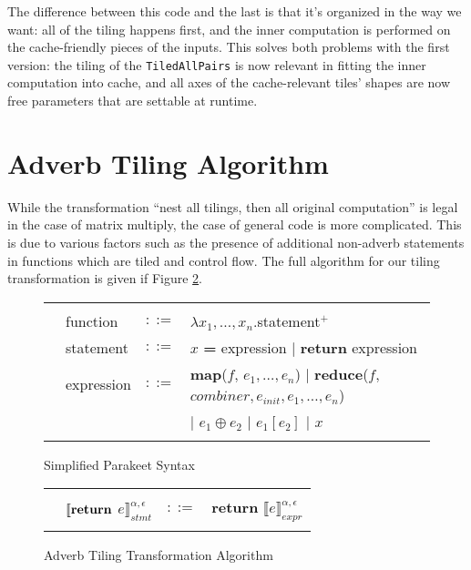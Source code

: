 The difference between this code and the last is that it's organized in the way we want: all of the tiling happens first, and the inner computation is performed on the cache-friendly pieces of the inputs. This solves both problems with the first version: the tiling of the \lstinline{TiledAllPairs} is now relevant in fitting the inner computation into cache, and all axes of the cache-relevant tiles' shapes are now free parameters that are settable at runtime.

\section{Adverb Tiling Algorithm\label{sec:adverb_tiling_algorithm}}

While the transformation ``nest all tilings, then all original computation'' is legal in the case of matrix multiply, the case of general code is more complicated.  This is due to various factors such as the presence of additional non-adverb statements in functions which are tiled and control flow.  The full algorithm for our tiling transformation is given if Figure \ref{tiling_algorithm}.

\begin{figure*}
\centering
\begin{tabular}{| m{0.01cm}llm{10.8cm} |}
\hline
& & &\\
& function   & $::=$ & $\lambda x_1,\ldots,x_n.$statement$^+$\\
& statement  & $::=$ & $x$ \textbf{= } expression $|$ \textbf{return} expression\\
& expression & $::=$ & \textbf{map}($f$, $e_1,\ldots,e_n$) $|$ \textbf{reduce}($f$, $combiner, e_{init}, e_1,\ldots,e_n$)\\
&            &       & $|$ $e_1 \oplus e_2 $ $|$ $e_1[e_2]$ $|$ $x$\\
& & &\\
\hline
\end{tabular}
\caption{Simplified Parakeet Syntax}
\label{tiling_syntax}
\end{figure*}

\begin{figure*}
\centering
\begin{tabular}{| m{0.01cm}llm{9.5cm} |}
\hline
& & &\\
& $\llbracket\textbf{\textrm{return}}$ $e\rrbracket^{\alpha,\epsilon}_{stmt}$ & $::=$ & \textbf{return} $\llbracket e \rrbracket^{\alpha,\epsilon}_{expr}$\\
& & &\\
\hline
\end{tabular}
\caption{Adverb Tiling Transformation Algorithm}
\label{tiling_algorithm}
\end{figure*}

